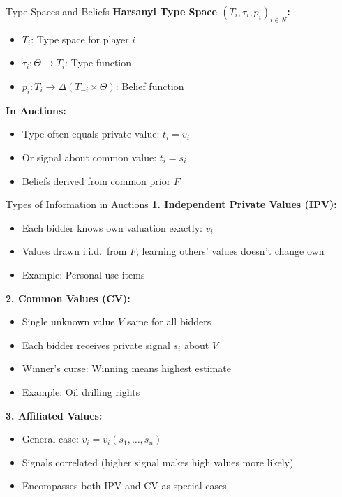 \documentclass[xcolor={x11names}, aspectratio=169 ]{beamer}
\begin{document}
\begin{frame}{Type Spaces and Beliefs}
\textbf{Harsanyi Type Space $(T_i, \tau_i, p_i)_{i \in N}$:}
\begin{itemize}
  \item $T_i$: Type space for player $i$
  \item $\tau_i: \Theta \to T_i$: Type function
  \item $p_i: T_i \to \Delta(T_{-i} \times \Theta)$: Belief function
\end{itemize}

\vspace{0.3cm}
\textbf{In Auctions:}
\begin{itemize}
  \item Type often equals private value: $t_i = v_i$
  \item Or signal about common value: $t_i = s_i$
  \item Beliefs derived from common prior $F$
\end{itemize}
\end{frame}

\begin{frame}{Types of Information in Auctions}
\textbf{1. Independent Private Values (IPV):}
\begin{itemize}
  \item Each bidder knows own valuation exactly: $v_i$
  \item Values drawn i.i.d.\ from $F$; learning others' values doesn't change own
  \item Example: Personal use items
\end{itemize}

\textbf{2. Common Values (CV):}
\begin{itemize}
  \item Single unknown value $V$ same for all bidders
  \item Each bidder receives private signal $s_i$ about $V$
  \item Winner's curse: Winning means highest estimate
  \item Example: Oil drilling rights
\end{itemize}

\textbf{3. Affiliated Values:}
\begin{itemize}
  \item General case: $v_i = v_i(s_1, \ldots, s_n)$
  \item Signals correlated (higher signal makes high values more likely)
  \item Encompasses both IPV and CV as special cases
\end{itemize}
\end{frame}
\end{document}
